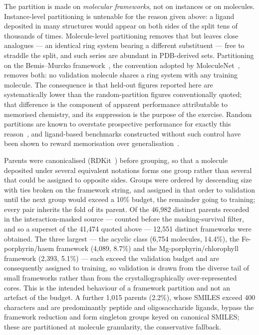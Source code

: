 The partition is made on \emph{molecular frameworks}, not on instances or on
molecules. Instance-level partitioning is untenable for the reason given above:
a ligand deposited in many structures would appear on both sides of the split
tens of thousands of times. Molecule-level partitioning removes that but leaves
close analogues --- an identical ring system bearing a different substituent
--- free to straddle the split, and such series are abundant in
PDB-derived sets. Partitioning on the Bemis--Murcko
framework~\cite{bemis1996frameworks}, the convention adopted by
MoleculeNet~\cite{wu2018moleculenet}, removes both: no validation molecule
shares a ring system with any training molecule. The consequence is that
held-out figures reported here are systematically lower than the
random-partition figures conventionally quoted; that difference is the
component of apparent performance attributable to memorised chemistry, and its
suppression is the purpose of the exercise. Random partitions are known to
overstate prospective performance for exactly this
reason~\cite{sheridan2013timesplit}, and ligand-based benchmarks constructed
without such control have been shown to reward memorisation over
generalisation~\cite{wallach2018memorization}.

Parents were canonicalised (RDKit~\cite{landrum2023rdkit}) before grouping, so
that a molecule deposited under several equivalent notations forms one group
rather than several that could be assigned to opposite sides. Groups were
ordered by descending size with ties broken on the framework string, and
assigned in that order to validation until the next group would exceed a 10\%
budget, the remainder going to training; every pair inherits the fold of its
parent. Of the 46{,}982 distinct parents recorded in the interaction-masked
source --- counted before the masking-survival filter, and so a superset of
the 41{,}474 quoted above --- 12{,}551 distinct frameworks were obtained. The three largest --- the acyclic
class (6{,}754 molecules, 14.4\%), the Fe-porphyrin/haem framework (4{,}089,
8.7\%) and the Mg-porphyrin/chlorophyll framework (2{,}393, 5.1\%) --- each
exceed the validation budget and are consequently assigned to training, so
validation is drawn from the diverse tail of small frameworks rather than from
the crystallographically over-represented cores. This is the intended
behaviour of a framework partition and not an artefact of the budget. A
further 1{,}015 parents (2.2\%), whose SMILES exceed 400 characters and are
predominantly peptide and oligosaccharide ligands, bypass the framework
reduction and form singleton groups keyed on canonical SMILES; these are
partitioned at molecule granularity, the conservative fallback.

